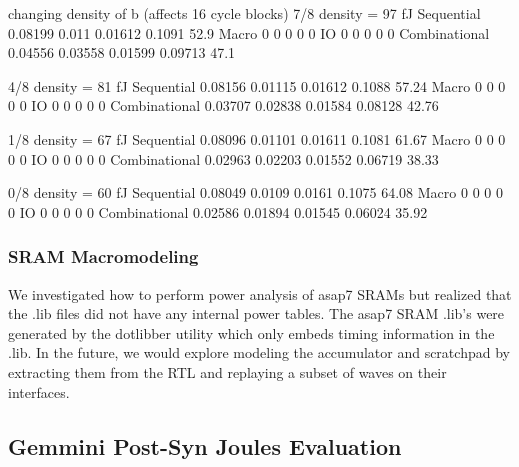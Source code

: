 \documentclass[sigconf]{acmart}
\begin{document}
changing density of b (affects 16 cycle blocks)
7/8 density = 97 fJ
Sequential                     0.08199        0.011       0.01612      0.1091        52.9
Macro                                0            0             0           0           0
IO                                   0            0             0           0           0
Combinational                  0.04556      0.03558       0.01599     0.09713        47.1

4/8 density = 81 fJ
Sequential                     0.08156      0.01115       0.01612      0.1088       57.24
Macro                                0            0             0           0           0
IO                                   0            0             0           0           0
Combinational                  0.03707      0.02838       0.01584     0.08128       42.76

1/8 density = 67 fJ
Sequential                     0.08096      0.01101       0.01611      0.1081       61.67
Macro                                0            0             0           0           0
IO                                   0            0             0           0           0
Combinational                  0.02963      0.02203       0.01552     0.06719       38.33

0/8 density = 60 fJ
Sequential                     0.08049       0.0109        0.0161      0.1075       64.08
Macro                                0            0             0           0           0
IO                                   0            0             0           0           0
Combinational                  0.02586      0.01894       0.01545     0.06024       35.92
\fi

\subsubsection{SRAM Macromodeling}
We investigated how to perform power analysis of asap7 SRAMs but realized that the .lib files did not have any internal power tables.
The asap7 SRAM .lib's were generated by the dotlibber utility which only embeds timing information in the .lib.
In the future, we would explore modeling the accumulator and scratchpad by extracting them from the RTL and replaying a subset of waves on their interfaces.

\subsection{Gemmini Post-Syn Joules Evaluation}
\end{document}
